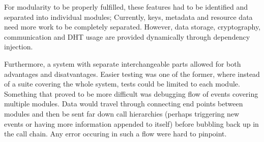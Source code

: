 For modularity to be properly fulfilled, these features had to be identified and separated into individual modules; Currently, keys, metadata and resource data need more work to be completely separated. However, data storage, cryptography, communication and DHT usage are provided dynamically through dependency injection.


Furthermore, a system with separate interchangeable parts allowed for both advantages and disatvantages. Easier testing was one of the former, where instead of a suite covering the whole system, tests could be limited to each module. Something that proved to be more difficult was debugging flow of events covering multiple modules. Data would travel through connecting end points between modules and then be sent far down call hierarchies (perhaps triggering new events or having more information appended to itself) before bubbling back up in the call chain. Any error occuring in such a flow were hard to pinpoint.